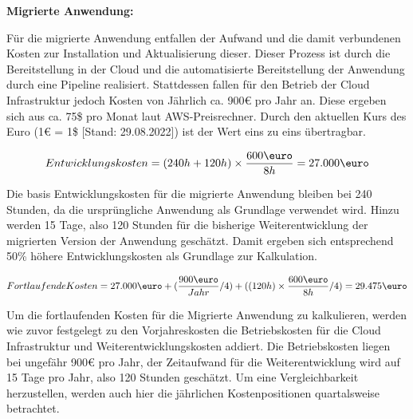 


\textbf{Migrierte Anwendung:}

Für die migrierte Anwendung entfallen der Aufwand und die damit verbundenen Kosten zur Installation und Aktualisierung dieser. Dieser Prozess ist durch die Bereitstellung in der Cloud und die automatisierte Bereitstellung der Anwendung durch eine Pipeline realisiert. Stattdessen fallen für den Betrieb der Cloud Infrastruktur jedoch Kosten von Jährlich ca. 900€ pro Jahr an. Diese ergeben sich aus ca. 75\$ pro Monat laut \ac{AWS}-Preisrechner. Durch den aktuellen Kurs des Euro (1€ = 1\$ [Stand: 29.08.2022]) ist der Wert eins zu eins übertragbar.

\begin{align}
    Entwicklungskosten = (240h + 120h) \times \frac{600\mbox{\euro}}{8h} = 27.000\mbox{\euro}
\end{align}

Die basis Entwicklungskosten für die migrierte Anwendung bleiben bei 240 Stunden, da die ursprüngliche Anwendung als Grundlage verwendet wird. Hinzu werden 15 Tage, also 120 Stunden für die bisherige Weiterentwicklung der migrierten Version der Anwendung
geschätzt. Damit ergeben sich entsprechend 50\% höhere Entwicklungskosten als Grundlage zur Kalkulation.

\begin{align}
    Fortlaufende Kosten = 27.000\mbox{\euro} + (\frac{900\mbox{\euro}}{Jahr}/4) + ((120h) \times \frac{600\mbox{\euro}}{8h}/4) = 29.475\mbox{\euro}
\end{align}

Um die fortlaufenden Kosten für die Migrierte Anwendung zu kalkulieren, werden wie zuvor festgelegt zu den Vorjahreskosten die Betriebskosten für die Cloud Infrastruktur und Weiterentwicklungskosten addiert. Die Betriebskosten liegen bei ungefähr 900€ pro Jahr, der Zeitaufwand für die Weiterentwicklung wird auf 15 Tage pro Jahr, also 120 Stunden geschätzt. Um eine Vergleichbarkeit herzustellen, werden auch hier die jährlichen Kostenpositionen quartalsweise betrachtet.

